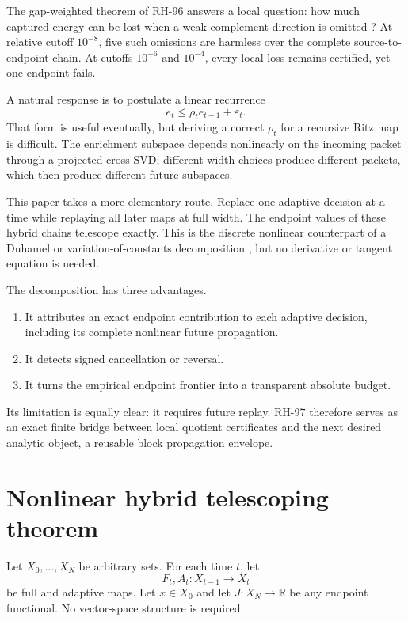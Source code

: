 \documentclass[11pt]{article}
\theoremstyle{definition}
\theoremstyle{remark}
\begin{document}
The gap-weighted theorem of RH-96 answers a local question: how much captured
energy can be lost when a weak complement direction is omitted
\citep{WangWeakMode2026}?  At relative cutoff $10^{-8}$, five such omissions
are harmless over the complete source-to-endpoint chain.  At cutoffs
$10^{-6}$ and $10^{-4}$, every local loss remains certified, yet one endpoint
fails.

A natural response is to postulate a linear recurrence
\[
 e_t\le\rho_te_{t-1}+\varepsilon_t.
\]
That form is useful eventually, but deriving a correct $\rho_t$ for a
recursive Ritz map is difficult.  The enrichment subspace depends
nonlinearly on the incoming packet through a projected cross SVD; different
width choices produce different packets, which then produce different future
subspaces.

This paper takes a more elementary route.  Replace one adaptive decision at a
time while replaying all later maps at full width.  The endpoint values of
these hybrid chains telescope exactly.  This is the discrete nonlinear
counterpart of a Duhamel or variation-of-constants decomposition
\citep{Deimling1985,HairerWanner1996}, but no derivative or tangent equation is
needed.

The decomposition has three advantages.
\begin{enumerate}[leftmargin=2em]
\item It attributes an exact endpoint contribution to each adaptive
decision, including its complete nonlinear future propagation.
\item It detects signed cancellation or reversal.
\item It turns the empirical endpoint frontier into a transparent absolute
budget.
\end{enumerate}
Its limitation is equally clear: it requires future replay.  RH-97 therefore
serves as an exact finite bridge between local quotient certificates and the
next desired analytic object, a reusable block propagation envelope.

\section{Nonlinear hybrid telescoping theorem}
\label{sec:theorem}

Let $X_0,\ldots,X_N$ be arbitrary sets.  For each time $t$, let
\[
 F_t,A_t:X_{t-1}\to X_t
\]
be full and adaptive maps.  Let $x\in X_0$ and let
$J:X_N\to\mathbb R$ be any endpoint functional.  No vector-space structure is
required.
\end{document}

